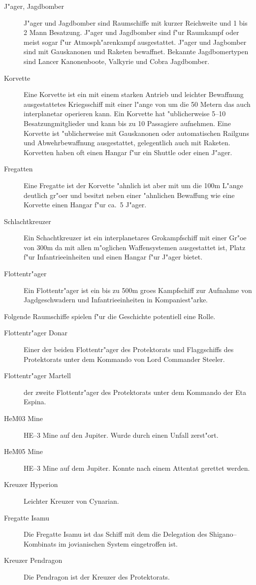 \begin{appendices}
\begin{description}
\item [J"ager, Jagdbomber] J"ager und Jagdbomber sind Raumschiffe mit kurzer Reichweite und 1 bis 2 Mann Besatzung.
      J"ager und Jagdbomber sind f"ur Raumkampf oder meist sogar f"ur Atmosph"arenkampf ausgestattet. J"ager und Jagbomber sind mit Gauskanonen und Raketen bewaffnet. Bekannte Jagdbomertypen sind Lancer Kanonenboote, Valkyrie  und Cobra Jagdbomber.
\item [Korvette] Eine Korvette ist ein mit einem starken Antrieb und leichter Bewaffnung ausgestattetes Kriegsschiff
      mit einer l"ange von um die 50 Metern das auch interplanetar operieren kann. Ein Korvette hat "ublicherweise 5--10 Besatzungmitglieder und kann bis zu 10 Passagiere aufnehmen. Eine Korvette ist "ublicherweise mit Gauskanonen oder automatischen Railguns und Abwehrbewaffnung ausgestattet, gelegentlich auch mit Raketen. Korvetten haben oft einen Hangar f"ur ein Shuttle oder einen J"ager.
\item [Fregatten] Eine Fregatte ist der Korvette "ahnlich ist aber mit um die 100m L"ange deutlich gr"o\3er und besitzt
      neben einer "ahnlichen Bewaffung wie eine Korvette einen Hangar f"ur ca.~5 J"ager.
\item [Schlachtkreuzer] Ein Schachtkreuzer ist ein interplanetares Gro\3kampfschiff mit einer Gr"o\3e von 300m da\3 mit allen m"oglichen Waffensystemen ausgestattet ist, Platz f"ur Infantrieeinheiten und einen Hangar f"ur J"ager bietet.
\item [Flottentr"ager] Ein Flottentr"ager ist ein bis zu 500m gro\3es Kampfschiff zur Aufnahme von
      Jagdgeschwadern und Infantrieeinheiten in Kompaniest"arke.
\end{description}

Folgende Raumschiffe spielen f"ur die Geschichte potentiell eine Rolle.

\begin{description}
\item [Flottentr"ager Donar] Einer der beiden Flottentr"ager des Protektorats und Flaggschiffs des Protektorats unter
       dem Kommando von Lord Commander Steeler.
\item [Flottentr"ager Martell] der zweite Flottentr"ager des Protektorats unter dem Kommando der Eta Espina.
\item [HeM03 Mine] HE--3 Mine auf den Jupiter. Wurde durch einen Unfall zerst"ort.
\item [HeM05 Mine] HE--3 Mine auf dem Jupiter. Konnte nach einem Attentat gerettet werden.
\item [Kreuzer Hyperion] Leichter Kreuzer von Cynarian.
\item [Fregatte Isamu] Die Fregatte Isamu ist das Schiff mit dem die Delegation des Shigano--Kombinats im jovianischen
      System eingetroffen ist.
\item [Kreuzer Pendragon] Die Pendragon ist der Kreuzer des Protektorats.
\end{description}


\end{appendices}
